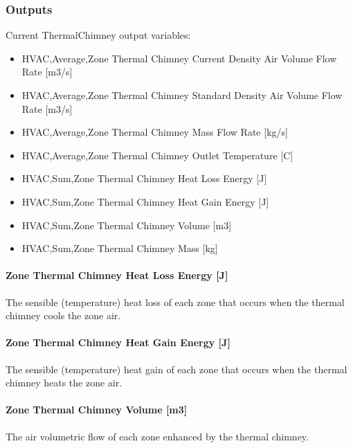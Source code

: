 \subsubsection{Outputs}\label{zonethermalchimney-outputs}

Current ThermalChimney output variables:

\begin{itemize}
\item
  HVAC,Average,Zone Thermal Chimney Current Density Air Volume Flow Rate {[}m3/s{]}
\item
  HVAC,Average,Zone Thermal Chimney Standard Density Air Volume Flow Rate {[}m3/s{]}
\item
  HVAC,Average,Zone Thermal Chimney Mass Flow Rate {[}kg/s{]}
\item
  HVAC,Average,Zone Thermal Chimney Outlet Temperature {[}C{]}
\item
  HVAC,Sum,Zone Thermal Chimney Heat Loss Energy {[}J{]}
\item
  HVAC,Sum,Zone Thermal Chimney Heat Gain Energy {[}J{]}
\item
  HVAC,Sum,Zone Thermal Chimney Volume {[}m3{]}
\item
  HVAC,Sum,Zone Thermal Chimney Mass {[}kg{]}
\end{itemize}

\paragraph{Zone Thermal Chimney Heat Loss Energy {[}J{]}}\label{zone-thermal-chimney-heat-loss-energy-j}

The sensible (temperature) heat loss of each zone that occurs when the thermal chimney cools the zone air.

\paragraph{Zone Thermal Chimney Heat Gain Energy {[}J{]}}\label{zone-thermal-chimney-heat-gain-energy-j}

The sensible (temperature) heat gain of each zone that occurs when the thermal chimney heats the zone air.

\paragraph{Zone Thermal Chimney Volume {[}m3{]}}\label{zone-thermal-chimney-volume-m3}

The air volumetric flow of each zone enhanced by the thermal chimney.

